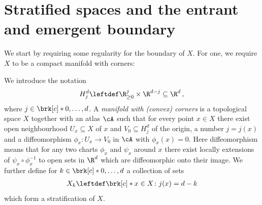 



\section{Stratified spaces and the entrant and emergent boundary}

We start by requiring some regularity for the boundary of $X$.
For one, we require $X$ to be a compact manifold with corners:
\begin{definition}
  We introduce the notation
  \begin{align*}
    H_j^d\leftdef\R_{\geq0}^j\times\R^{d-j}\subseteq\R^d\,,
  \end{align*}
  where $j\in\brk[c]*{0,\dots,d}$.
  A \emph{manifold with (convex) corners} is a topological space $X$ together with an atlas $\cA$ such that for every point
  $x\in X$ there exist open neighbourhood $U_x\subseteq X$ of $x$ and $V_0\subseteq H_j^d$ of the origin, a number $j=j(x)$ and a
  diffeomorphism $\phi_x\colon U_x\to V_0$ in $\cA$ with $\phi_x(x)=0$.
  Here diffeomorphism means that for any two charts $\phi_x$ and $\psi_x$ around $x$ there
  exist locally extensions of $\psi_x\circ\phi_x^{-1}$ to open sets
  in $\R^d$ which are diffeomorphic onto their image.
  We further define for $k\in\brk[c]*{0,\dots,d}$ a collection of sets 
  \begin{align}
    X_k\leftdef\brk[c]*{x\in X\colon j(x)=d-k}\label{eq:def_mfCorners_stratification}
  \end{align}
  which form a stratification of $X$.
\end{definition}

